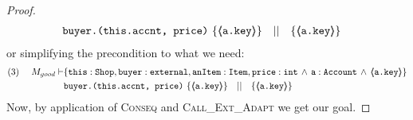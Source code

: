 \begin{proof}
\begin{align*}
		 & \prg{buyer.(this.accnt, price)} \ \{ \inside{\prg{a.key}} \} \ \ \  || \ \ \  \{ \inside{\prg{a.key}} \}
\end{align*}
\normalsize
or simplifying the precondition to what we need:
\small
\begin{align*}
\text{(3)} \ \ \ \ M_{good} \vdash & \{  \prg{this}:\prg{Shop}, \prg{buyer} : \prg{external}, \prg{anItem} : \prg{Item}, \prg{price} : \prg{int} \, \wedge\, 
		 \prg{a} : \prg{Account}\, \wedge\,  \inside{\prg{a.key}} \}  \\
		 & \prg{buyer.(this.accnt, price)} \ \{ \inside{\prg{a.key}} \} \ \ \  || \ \ \  \{ \inside{\prg{a.key}} \}
\end{align*}
\normalsize
Now, by application of \textsc{Conseq} and \textsc{Call\_Ext\_Adapt} we get our goal.
%
\end{proof}

